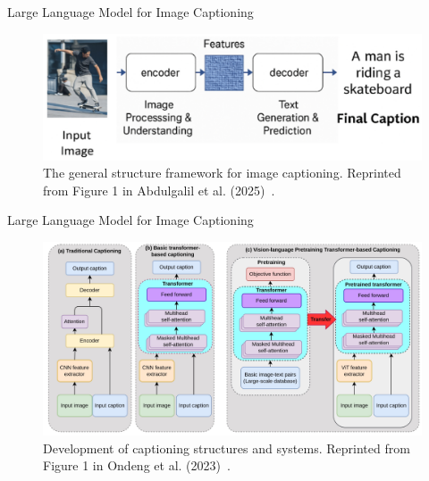 \documentclass[12pt]{beamer}
\begin{document}
\begin{frame}[allowframebreaks]{Large Language Model for Image Captioning}
    \begin{figure}
        \centering
        \includegraphics[width=0.9\linewidth]{figures/image_captioning.png}
        \caption{The general structure framework for image captioning. Reprinted from Figure 1 in Abdulgalil et al. (2025)~\cite{ABDULGALIL2025100159}.}
        \label{fig:Fig. 9}
    \end{figure}
\end{frame}

\begin{frame}[allowframebreaks]{Large Language Model for Image Captioning}
    \begin{figure}
        \centering
        \includegraphics[width=0.9\linewidth]{figures/transformer_image_captioning.png}
        \caption{Development of captioning structures and systems. Reprinted from Figure 1 in Ondeng et al. (2023)~\cite{app131911103}.}
        \label{fig:Fig. 10}
    \end{figure}
\end{frame}
\end{document}
